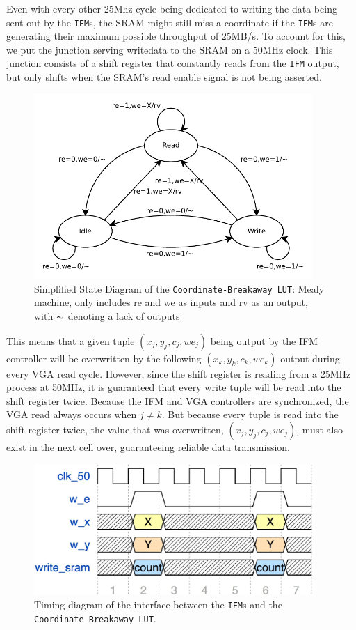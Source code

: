 \documentclass{article}
\begin{document}
Even with every other 25Mhz cycle being dedicated to writing the data being sent out by the \texttt{IFM}s, the SRAM might
still miss a coordinate if the \texttt{IFM}s are generating their maximum possible throughput of 25MB/s. To account for this, 
we put the junction serving writedata to the SRAM on a 50MHz clock. This junction consists of a shift register that 
constantly reads from the \texttt{IFM} output, but only shifts when the SRAM's read enable signal is not being asserted. 

\begin{figure}[H]
  \centering
    \includegraphics[width=300pt]{state_diagrams/clut.pdf}
  \caption{Simplified State Diagram of the \texttt{Coordinate-Breakaway LUT}:
    Mealy machine, only includes re and we as inputs and rv as an
    output, with $\thicksim$ denoting a lack of outputs}
\end{figure}

This means that a given tuple $(x_j, y_j, c_j, we_j)$ being output by the IFM controller will be overwritten by the 
following $(x_k, y_k, c_k, we_k)$ output during every VGA read cycle. However, since the shift register is reading from a 25MHz process at 50MHz, it is guaranteed that every write tuple will be read into the shift register twice. Because the IFM
and VGA controllers are synchronized, the VGA read always occurs when $j \neq k$. But because every tuple is read into the
shift register twice, the value that was overwritten, $(x_j, y_j, c_j, we_j)$, must also exist in the next cell over, 
guaranteeing reliable data transmission.

\begin{figure}[H]
  \centering
    \includegraphics[width=300pt]{timing_diagrams/ifm_clut.pdf}
  \caption{Timing diagram of the interface between the \texttt{IFM}s and the \texttt{Coordinate-Breakaway LUT}.}
\end{figure}
\end{document}
